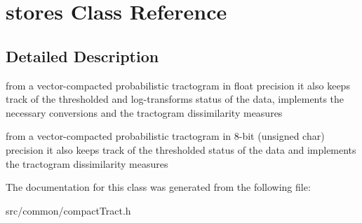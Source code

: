 \hypertarget{classstores}{\section{stores \-Class \-Reference}
\label{classstores}
}


\subsection{\-Detailed \-Description}
from a vector-\/compacted probabilistic tractogram in float precision it also keeps track of the thresholded and log-\/transforms status of the data, implements the necessary conversions and the tractogram dissimilarity measures

from a vector-\/compacted probabilistic tractogram in 8-\/bit (unsigned char) precision it also keeps track of the thresholded status of the data and implements the tractogram dissimilarity measures 

\-The documentation for this class was generated from the following file\-:\begin{DoxyCompactItemize}
\item 
src/common/compact\-Tract.\-h\end{DoxyCompactItemize}
